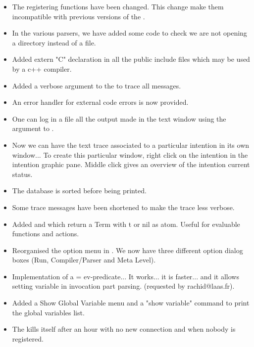 \begin{itemize}
\item The \MPA{} registering functions have been changed. This change make them
incompatible with previous versions of the \MPA{}.

\item In the various parsers, we have added some code to check we are not
opening a directory instead of a file.

\item Added extern "C" declaration in all the public include files
which may be used by a c++ compiler.

\item Added a verbose argument  to the \MPA{} to trace all messages.

\item An error handler for external code errors is now provided. 

\item One can log in a file all the output made in the \XOPRS{} text window
using the  argument to \XOPRS{}. 

\item Now we can have the text trace associated to a particular intention in
its own window... To create this particular window, right click on the
intention in the intention graphic pane. Middle click gives an overview of the
intention current status.

\item The database is sorted before being printed.

\item Some trace messages have been shortened to make the trace less
verbose.

\item Added  and  which return a Term with t or
nil as atom. Useful for evaluable functions and actions.

\item Reorganised the option menu in \XOPRS{}. We now have three different
option dialog boxes (Run, Compiler/Parser and Meta Level).

\item  Implementation of a = ev-predicate... It works... it is faster... and it
allows setting variable in invocation part parsing. (requested by
rachid@laas.fr).

\item Added a Show Global Variable menu and a "show variable" command to print
the global variables list. 

\item The \MPA{} kills itself after an hour with no new connection and when
nobody is registered. 


\end{itemize}
